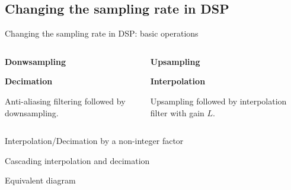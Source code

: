 \documentclass[10pt, aspectratio=169]{beamer}
\begin{document}
\subsection{Changing the sampling rate in DSP}
\begin{frame}{Changing the sampling rate in DSP: basic operations}
\begin{columns}[t]
	\begin{column}{0.5\textwidth}
		\textbf{Donwsampling}
		\begin{center}
			\resizebox{!}{0.18\textheight}{}
		\end{center}
		\textbf{Decimation}
		\begin{center}
			\resizebox{!}{0.22\textheight}{}
		\end{center}
		Anti-aliasing filtering followed by downsampling.
	\end{column}
	\begin{column}{0.5\textwidth}
	\textbf{Upsampling}
	\vspace{-0.7cm}
	\begin{center}
		\resizebox{1\textwidth}{!}{}
	\end{center}
	
	\textbf{Interpolation}
	\vspace{0.35cm}
	\begin{center}
	\resizebox{!}{0.15\textheight}{}
	\end{center}
	Upsampling followed by interpolation filter with gain $L$.
	\end{column}
\end{columns}
\end{frame}

\begin{frame}{Interpolation/Decimation by a non-integer factor}

\begin{block}{Cascading interpolation and decimation}
	\vspace{-0.5cm}
	\begin{center}
		\resizebox{\linewidth}{!}{}
	\end{center}
\end{block}
\vspace{-0.5cm}
\begin{block}{Equivalent diagram}
	\begin{center}
		\resizebox{0.8\linewidth}{!}{}
	\end{center}
\end{block}
\end{frame}
\end{document}
